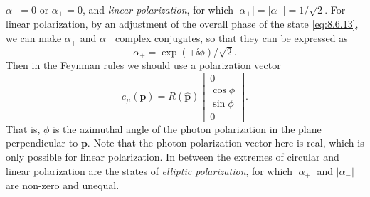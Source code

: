 $\alpha_-=0$ or $\alpha_+=0$, and \emph{linear polarization}, for which
$\lvert\alpha_+\rvert=\lvert\alpha_-\rvert=1/\sqrt2$. For linear
polarization, by an adjustment of the overall phase of the state \eqref{eq:8.6.13}, we
can make $\alpha_+$ and $\alpha_-$ complex conjugates, so that they can be
expressed as
\begin{equation}
\alpha_\pm=\exp(\mp \ii\phi)/\sqrt2.
\tag{8.6.18}\label{eq:8.6.18}
\end{equation}
Then in the Feynman rules we should use a polarization vector
\begin{equation}
e_\mu(\mathbf p)=R(\widehat{\mathbf p})
\begin{bmatrix}
0\\[1pt]\cos\phi\\[1pt]\sin\phi\\[1pt]0
\end{bmatrix}.
\tag{8.6.19}\label{eq:8.6.19}
\end{equation}
That is, $\phi$ is the azimuthal angle of the photon polarization in the plane
perpendicular to $\mathbf p$. Note that the photon polarization vector here is
real, which is only possible for linear polarization. In between the extremes
of circular and linear polarization are the states of \emph{elliptic
polarization}, for which $\lvert\alpha_+\rvert$ and
$\lvert\alpha_-\rvert$ are non-zero and unequal.

